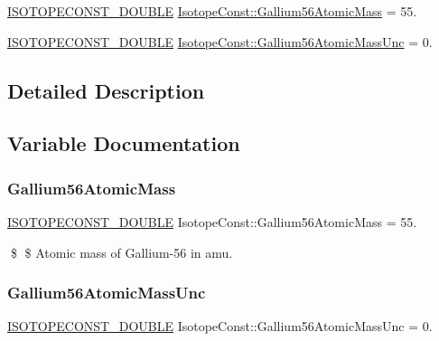 \begin{DoxyCompactItemize}
\item 
\mbox{\hyperlink{group___isotope_const-_macros_ga8f45a7272ce02c0b4c65c44636ed719a}{I\+S\+O\+T\+O\+P\+E\+C\+O\+N\+S\+T\+\_\+\+D\+O\+U\+B\+LE}} \mbox{\hyperlink{group___isotope_const-_gallium-_ga56_ga001b8f6a9150f908bb2856c15e713d14}{Isotope\+Const\+::\+Gallium56\+Atomic\+Mass}} = 55.
\item 
\mbox{\hyperlink{group___isotope_const-_macros_ga8f45a7272ce02c0b4c65c44636ed719a}{I\+S\+O\+T\+O\+P\+E\+C\+O\+N\+S\+T\+\_\+\+D\+O\+U\+B\+LE}} \mbox{\hyperlink{group___isotope_const-_gallium-_ga56_ga489aa3dd3325f7fa3747c616b91c8de6}{Isotope\+Const\+::\+Gallium56\+Atomic\+Mass\+Unc}} = 0.
\end{DoxyCompactItemize}


\subsection{Detailed Description}


\subsection{Variable Documentation}
\mbox{\label{group___isotope_const-_gallium-_ga56_ga001b8f6a9150f908bb2856c15e713d14}} 
\subsubsection{\texorpdfstring{Gallium56\+Atomic\+Mass}{Gallium56AtomicMass}}
{\footnotesize\ttfamily \mbox{\hyperlink{group___isotope_const-_macros_ga8f45a7272ce02c0b4c65c44636ed719a}{I\+S\+O\+T\+O\+P\+E\+C\+O\+N\+S\+T\+\_\+\+D\+O\+U\+B\+LE}} Isotope\+Const\+::\+Gallium56\+Atomic\+Mass = 55.}

\$ \$ Atomic mass of Gallium-\/56 in amu. \mbox{\label{group___isotope_const-_gallium-_ga56_ga489aa3dd3325f7fa3747c616b91c8de6}} 
\subsubsection{\texorpdfstring{Gallium56\+Atomic\+Mass\+Unc}{Gallium56AtomicMassUnc}}
{\footnotesize\ttfamily \mbox{\hyperlink{group___isotope_const-_macros_ga8f45a7272ce02c0b4c65c44636ed719a}{I\+S\+O\+T\+O\+P\+E\+C\+O\+N\+S\+T\+\_\+\+D\+O\+U\+B\+LE}} Isotope\+Const\+::\+Gallium56\+Atomic\+Mass\+Unc = 0.}

